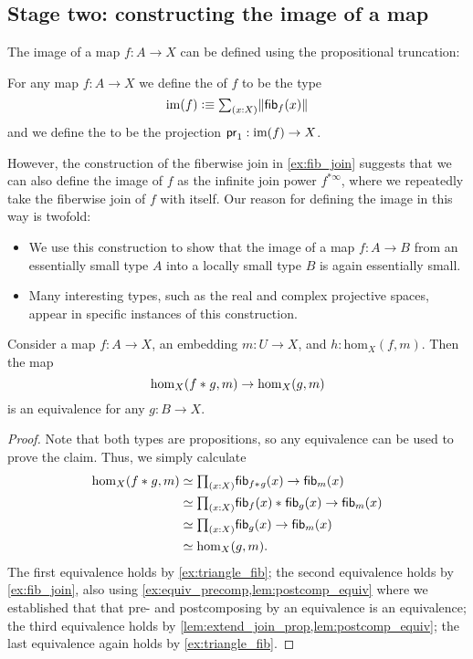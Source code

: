 \subsection{Stage two: constructing the image of a map}\label{sec:join_stage2}
The image of a map $f:A\to X$ can be defined using the propositional truncation:
\begin{defn}
For any map $f:A\to X$ we define the  of $f$ to be the type
\begin{equation*}
\im(f) \defeq \sm{x:X}\brck{\fib{f}{x}}
\end{equation*}
and we define the  to be the projection $\mathsf{pr}_{1} :\operatorname{im}(f)\to X$. 
\end{defn}
However, the construction of the fiberwise join in \cref{ex:fib_join} suggests that we can also define the image of $f$ as the infinite join power $f^{\ast\infty}$, where we repeatedly take the fiberwise join of $f$ with itself. Our reason for defining the image in this way is twofold: 
\begin{itemize}
\item We use this construction to show that the image of a map $f:A\to B$ from an essentially small type $A$ into a locally small type $B$ is again essentially small.
\item Many interesting types, such as the real and complex projective spaces, appear in specific instances of this construction.
\end{itemize}

\begin{lem}
Consider a map $f:A\to X$, an embedding $m:U\to X$, and $h:\mathrm{hom}_X(f,m)$. Then the map
\begin{equation*}
\mathrm{hom}_X({f}\ast_{}{g},m)\to \mathrm{hom}_X(g,m)
\end{equation*}
is an equivalence for any $g:B\to X$.
\end{lem}

\begin{proof}
Note that both types are propositions, so any equivalence can be used to prove the claim. Thus, we simply calculate
\begin{align*}
\mathrm{hom}_X(\join{f}{g},m) & \eqvsym \prd{x:X}\fib{\join{f}{g}}{x}\to \fib{m}{x} \\
& \eqvsym \prd{x:X}\join{\fib{f}{x}}{\fib{g}{x}}\to\fib{m}{x} \\
& \eqvsym \prd{x:X}\fib{g}{x}\to\fib{m}{x} \\
& \eqvsym \mathrm{hom}_X(g,m).
\end{align*}
The first equivalence holds by \cref{ex:triangle_fib}; the second equivalence holds by \cref{ex:fib_join}, also using \cref{ex:equiv_precomp,lem:postcomp_equiv} where we established that that pre- and postcomposing by an equivalence is an equivalence; the third equivalence holds by \cref{lem:extend_join_prop,lem:postcomp_equiv}; the last equivalence again holds by \cref{ex:triangle_fib}.
\end{proof}

